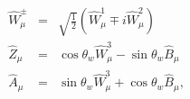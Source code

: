 % 
% 
% 
% 
% 
% 
 
\begin{eqnarray}
\hat{W}_{\mu}^{\pm} & = &  \sqrt{\frac{1}{2}} \left( \hat{W}_{\mu}^{1} \mp i \hat{W}_{\mu}^{2} \right) \nonumber \\
\hat{Z}_{\mu} &  = & \cos\theta_{w} \hat{W}_{\mu}^{3} - \sin\theta_{w} \hat{B}_{\mu} \nonumber \\
\hat{A}_{\mu} &  = & \sin\theta_{w} \hat{W}_{\mu}^{3} + \cos\theta_{w} \hat{B}_{\mu},
\label{eqn:ewkbosons}
\end{eqnarray}
 

